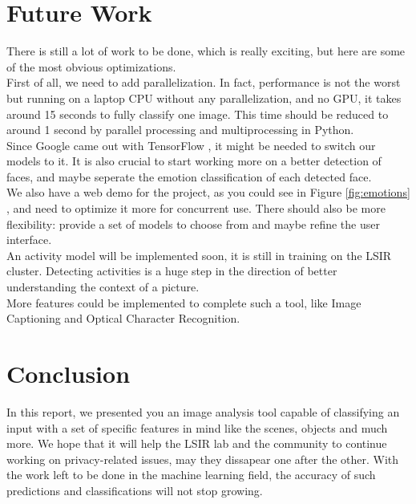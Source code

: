 \documentclass{article}
\begin{document}
\section{Future Work}
    There is still a lot of work to be done, which is really exciting, but here are some of the most obvious optimizations. 
    \\First of all, we need to add parallelization. In fact, performance is not the worst but running on a laptop CPU without any parallelization, and no GPU, it takes around 15 seconds to fully classify one image. This time should be reduced to around 1 second by parallel processing and multiprocessing in Python. 
    \\Since Google came out with TensorFlow \cite{tensor}, it might be needed to switch our models to it. It is also crucial to start working more on a better detection of faces, and maybe seperate the emotion classification of each detected face. 
    \\We also have a web demo for the project, as you could see in Figure \ref{fig:emotions} \cite{demo}, and need to optimize it more for concurrent use. There should also be more flexibility: provide a set of models to choose from and maybe refine the user interface. 
    \\An activity model will be implemented soon, it is still in training on the LSIR cluster. 
    Detecting activities is a huge step in the direction of better understanding the context of a picture. 
    \\More features could be implemented to complete such a tool, like Image Captioning and Optical Character Recognition.
\section{Conclusion}
    In this report, we presented you an image analysis tool capable of classifying an input with a set of specific features in mind like the scenes, objects and much more. We hope that it will help the LSIR lab \cite{lsir} and the community to continue working on privacy-related issues, may they dissapear one after the other. With the work left to be done in the machine learning field, the accuracy of such predictions and classifications will not stop growing.
\end{document}
